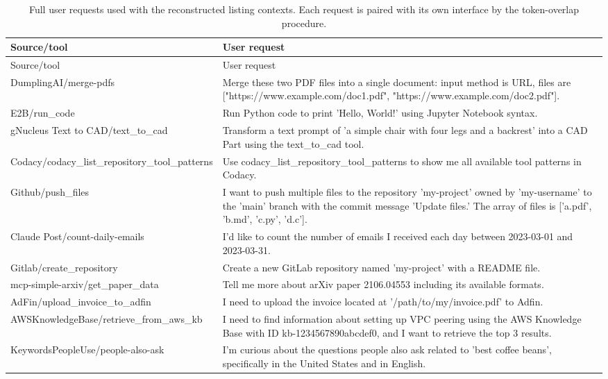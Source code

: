 \begin{center}\scriptsize\setlength{\tabcolsep}{3pt}\begin{longtable}{@{}p{}p{}@{}}
\caption{Full user requests used with the reconstructed listing contexts. Each request is paired with its own interface by the token-overlap procedure.}\label{tab:context-tasks}\\
\toprule
Source/tool & User request \\\midrule
\endfirsthead\toprule
Source/tool & User request \\\midrule\endhead
DumplingAI/merge-pdfs & Merge these two PDF files into a single document: input method is URL, files are ["https://www.example.com/doc1.pdf", "https://www.example.com/doc2.pdf"]. \\
E2B/run\_code & Run Python code to print 'Hello, World!' using Jupyter Notebook syntax. \\
gNucleus Text to CAD/text\_to\_cad & Transform a text prompt of 'a simple chair with four legs and a backrest' into a CAD Part using the text\_to\_cad tool. \\
Codacy/codacy\_list\_repository\_tool\_patterns & Use codacy\_list\_repository\_tool\_patterns to show me all available tool patterns in Codacy. \\
Github/push\_files & I want to push multiple files to the repository 'my-project' owned by 'my-username' to the 'main' branch with the commit message 'Update files.' The array of files is ['a.pdf', 'b.md', 'c.py', 'd.c']. \\
Claude Post/count-daily-emails & I'd like to count the number of emails I received each day between 2023-03-01 and 2023-03-31. \\
Gitlab/create\_repository & Create a new GitLab repository named 'my-project' with a README file. \\
mcp-simple-arxiv/get\_paper\_data & Tell me more about arXiv paper 2106.04553 including its available formats. \\
AdFin/upload\_invoice\_to\_adfin & I need to upload the invoice located at '/path/to/my/invoice.pdf' to Adfin. \\
AWSKnowledgeBase/retrieve\_from\_aws\_kb & I need to find information about setting up VPC peering using the AWS Knowledge Base with ID kb-1234567890abcdef0, and I want to retrieve the top 3 results. \\
KeywordsPeopleUse/people-also-ask & I'm curious about the questions people also ask related to 'best coffee beans', specifically in the United States and in English. \\

\end{longtable}
\end{center}
